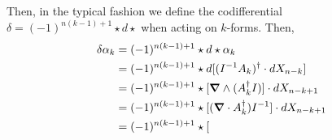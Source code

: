 Then, in the typical fashion we define the codifferential $\delta = (-1)^{n(k-1)+1} \star d \star$ when acting on $k$-forms.  Then,
\begin{align*}
    \delta \alpha_k &= (-1)^{n(k-1)+1} \star d \star \alpha_k \\
    &= (-1)^{n(k-1)+1} \star d [(I^{-1} A_k)^\dagger  \cdot dX_{n-k}]\\
    &= (-1)^{n(k-1)+1} \star [\boldsymbol{\nabla} \wedge (A_k^\dagger I)] \cdot dX_{n-k+1}\\
    &= (-1)^{n(k-1)+1} \star [(\boldsymbol{\nabla} \cdot A_k^\dagger)I^{-1} ] \cdot dX_{n-k+1}\\
    &= (-1)^{n(k-1)+1} \star [
\end{align*}





